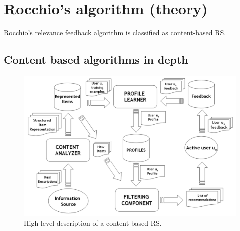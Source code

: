 
\section{Rocchio's algorithm (theory)}

Rocchio's relevance feedback algorithm is classified as content-based RS.

\subsection{Content based algorithms in depth}
\label{sec:rocchio-contentbased}

\begin{figure}[h]
    \includegraphics[scale=0.3]{inc/rocchio/HighlevelContentBased}
    \caption{High level description of a content-based RS.\citep[p.~76]{lops:2011}}
\end{figure}
